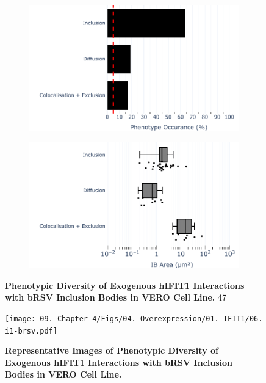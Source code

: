 \begin{figure}
    \begin{subfigure}{0.495\textwidth}
        \caption{}
        \includegraphics[width=1\linewidth]{09. Chapter 4/Figs/04. Overexpression/01. IFIT1/04. bar_i1_brsv.pdf} 
    \end{subfigure}
    \begin{subfigure}{0.495\textwidth}
        \caption{}
        \includegraphics[width=1\linewidth]{09. Chapter 4/Figs/04. Overexpression/01. IFIT1/05. box_i1_brsv.pdf}
    \end{subfigure}
    \caption[Phenotypic Diversity of Exogenous hIFIT1 Interactions with bRSV Inclusion Bodies in VERO Cell Line.]{\textbf{Phenotypic Diversity of Exogenous hIFIT1 Interactions with bRSV Inclusion Bodies in VERO Cell Line.} 47}
    \label{fig:Phenotypic Diversity of Exogenous hIFIT1 Interactions with bRSV Inclusion Bodies in VERO Cell Line}
\end{figure}

\begin{figure}
    \centering
    \texttt{[image: 09. Chapter 4/Figs/04. Overexpression/01. IFIT1/06. i1-brsv.pdf]}
    \caption[Representative Images of Phenotypic Diversity of Exogenous hIFIT1 Interactions with bRSV Inclusion Bodies in VERO Cell Line.]{\textbf{Representative Images of Phenotypic Diversity of Exogenous hIFIT1 Interactions with bRSV Inclusion Bodies in VERO Cell Line.} }
    \label{fig:Representative Images of Phenotypic Diversity of Exogenous hIFIT1 Interactions with bRSV Inclusion Bodies in VERO Cell Line}
\end{figure}


